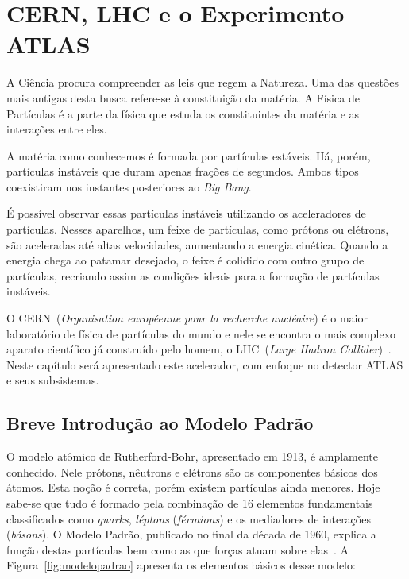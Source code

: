 \chapter{CERN, LHC e o Experimento ATLAS}

A Ciência procura compreender as leis que regem a Natureza. Uma das questões
mais antigas desta busca refere-se à constituição da matéria. A Física de
Partículas é a parte da física que estuda os constituintes da matéria e as
interações entre eles.

A matéria como conhecemos é formada por partículas estáveis. Há, porém,
partículas instáveis que duram apenas frações de segundos. Ambos tipos
coexistiram nos instantes posteriores ao \emph{Big Bang}.

É possível observar essas partículas instáveis utilizando os aceleradores de
partículas. Nesses aparelhos, um feixe de partículas, como prótons ou elétrons,
são aceleradas até altas velocidades, aumentando a energia cinética.  Quando a
energia chega ao patamar desejado, o feixe é colidido com outro grupo de
partículas, recriando assim as condições ideais para a formação de partículas
instáveis.

O CERN~(\emph{Organisation européenne pour la recherche nucléaire}) é o maior
laboratório de física de partículas do mundo e nele se encontra o mais complexo
aparato científico já construído pelo homem, o LHC~(\emph{Large Hadron
Collider})~\cite{EVANS2008}. Neste capítulo será apresentado este acelerador,
com enfoque no detector ATLAS e seus subsistemas.

\section{Breve Introdução ao Modelo Padrão}

O modelo atômico de Rutherford-Bohr, apresentado em 1913, é amplamente
conhecido. Nele prótons, nêutrons e elétrons são os componentes básicos dos
átomos. Esta noção é correta, porém existem partículas ainda menores. Hoje
sabe-se que tudo é formado pela combinação de 16 elementos fundamentais
classificados como \emph{quarks}, \emph{léptons} (\emph{férmions}) e os
mediadores de interações (\emph{bósons}).  O Modelo Padrão, publicado no final
da década de 1960, explica a função destas partículas bem como as que forças
atuam sobre elas~\cite{GRIFFITHS2008}. A Figura~\ref{fig:modelopadrao}
apresenta os elementos básicos desse modelo:

